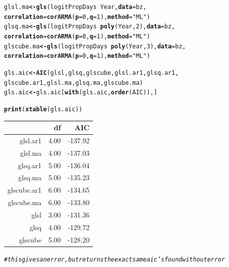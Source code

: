 \documentclass[11pt]{article}\usepackage[]{graphicx}\usepackage[]{color}
\makeatletter
\newcommand{\hlnum}[1]{\textcolor[rgb]{0,0,0}{#1}}%
\newcommand{\hlstr}[1]{\textcolor[rgb]{0,0,0}{#1}}%
\newcommand{\hlcom}[1]{\textcolor[rgb]{0.4,0.4,0.4}{\textit{#1}}}%
\newcommand{\hlopt}[1]{\textcolor[rgb]{0,0,0}{\textbf{#1}}}%
\newcommand{\hlstd}[1]{\textcolor[rgb]{0,0,0}{#1}}%
\newcommand{\hlkwb}[1]{\textcolor[rgb]{0,0,0}{\textbf{#1}}}%
\newcommand{\hlkwc}[1]{\textcolor[rgb]{0,0,0}{\textbf{#1}}}%
\newcommand{\hlkwd}[1]{\textcolor[rgb]{0,0,0}{\textbf{#1}}}%
\newenvironment{kframe}{%
 \def\at@end@of@kframe{}%
 \ifinner\ifhmode%
  \def\at@end@of@kframe{\end{minipage}}%
  \begin{minipage}{\columnwidth}%
 \fi\fi%
 \def\FrameCommand##1{\hskip\@totalleftmargin \hskip-\fboxsep
 \colorbox{shadecolor}{##1}\hskip-\fboxsep
     \hskip-\linewidth \hskip-\@totalleftmargin \hskip\columnwidth}%
 \MakeFramed {\advance\hsize-\width
   \@totalleftmargin\z@ \linewidth\hsize
   \@setminipage}}%
 {\par\unskip\endMakeFramed%
 \at@end@of@kframe}
\makeatother
\begin{document}
\begin{enumerate}
\begin{enumerate}
\begin{kframe}
\begin{alltt}
\hlstd{glsl.ma} \hlkwb{<-} \hlkwd{gls}\hlstd{(logitPropDays} \hlopt{~} \hlstd{Year,} \hlkwc{data} \hlstd{= bz,}
               \hlkwc{correlation}\hlstd{=}\hlkwd{corARMA}\hlstd{(}\hlkwc{p}\hlstd{=}\hlnum{0}\hlstd{,}\hlkwc{q}\hlstd{=}\hlnum{1}\hlstd{),}\hlkwc{method}\hlstd{=}\hlstr{"ML"}\hlstd{)}
\hlstd{glsq.ma} \hlkwb{<-} \hlkwd{gls}\hlstd{(logitPropDays} \hlopt{~} \hlkwd{poly}\hlstd{(Year,} \hlnum{2}\hlstd{),} \hlkwc{data} \hlstd{= bz,}
               \hlkwc{correlation}\hlstd{=}\hlkwd{corARMA}\hlstd{(}\hlkwc{p}\hlstd{=}\hlnum{0}\hlstd{,}\hlkwc{q}\hlstd{=}\hlnum{1}\hlstd{),}\hlkwc{method}\hlstd{=}\hlstr{"ML"}\hlstd{)}
\hlstd{glscube.ma} \hlkwb{<-} \hlkwd{gls}\hlstd{(logitPropDays} \hlopt{~} \hlkwd{poly}\hlstd{(Year,}\hlnum{3}\hlstd{),} \hlkwc{data} \hlstd{= bz,}
                  \hlkwc{correlation}\hlstd{=}\hlkwd{corARMA}\hlstd{(}\hlkwc{p}\hlstd{=}\hlnum{0}\hlstd{,}\hlkwc{q}\hlstd{=}\hlnum{1}\hlstd{),}\hlkwc{method}\hlstd{=}\hlstr{"ML"}\hlstd{)}


\hlstd{gls.aic} \hlkwb{<-} \hlkwd{AIC}\hlstd{(glsl, glsq, glscube, glsl.ar1, glsq.ar1,}
               \hlstd{glscube.ar1, glsl.ma, glsq.ma, glscube.ma)}
\hlstd{gls.aic} \hlkwb{<-} \hlstd{gls.aic[}\hlkwd{with}\hlstd{(gls.aic,} \hlkwd{order}\hlstd{(AIC)), ]}

\hlkwd{print}\hlstd{(}\hlkwd{xtable}\hlstd{(gls.aic))}
\end{alltt}
\end{kframe}%
\begin{table}[H]
\centering
\begin{tabular}{rrr}
  \hline
 & df & AIC \\ 
  \hline
glsl.ar1 & 4.00 & -137.92 \\ 
  glsl.ma & 4.00 & -137.03 \\ 
  glsq.ar1 & 5.00 & -136.04 \\ 
  glsq.ma & 5.00 & -135.23 \\ 
  glscube.ar1 & 6.00 & -134.65 \\ 
  glscube.ma & 6.00 & -133.80 \\ 
  glsl & 3.00 & -131.36 \\ 
  glsq & 4.00 & -129.72 \\ 
  glscube & 5.00 & -128.20 \\ 
   \hline
\end{tabular}
\end{table}
\begin{kframe}\begin{alltt}
\hlcom{#this gives an error, but returns the exact same aic's found without error }
\end{alltt}
\end{kframe}


\end{enumerate}
\end{enumerate}
\end{document}
